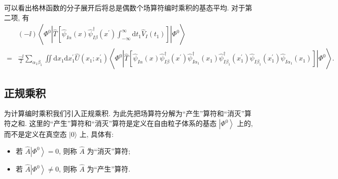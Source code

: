 可以看出格林函数的分子展开后将总是偶数个场算符编时乘积的基态平均. 对于第二项, 有
\begin{equation}
\begin{aligned}
&(-\ii)\left\langle\Phi^{0}\left|\hat{T}\left[\hat{\psi}^{}_{I \alpha}(x)\hat{\psi}^{\dagger}_{I \beta}\left(x^{\prime}\right) \int_{-\infty}^{\infty} \mathrm{d} t_1 \hat{V}_{I}(t_1)\right]\right| \Phi^{0}\right\rangle \\
=&\frac{-\ii}{2} \sum_{\alpha_1 \beta_1} \iint \mathrm{d}{x^{}_1} \mathrm{d} x_1^{\prime}  \hat U\left(x^{}_1 ; x_1^{\prime}\right)\left\langle\Phi^{0}\left|\hat{T}\left[\hat{\psi}^{}_{I \alpha}(x^{})\hat{\psi}^{\dagger}_{I \beta}\left(x^{\prime}\right)\hat{\psi}^{\dagger}_{I \alpha_1}(x^{}_1)\hat{\psi}^{\dagger}_{I \beta_1}\left(x^{\prime}_1\right)\hat{\psi}^{}_{I \beta_1}\left(x_1^{\prime}\right)\hat{\psi}^{}_{I \alpha_1}(x^{}_1) \right]\right| \Phi^{0}\right\rangle.
\end{aligned}
\end{equation}

\subsection{正规乘积}
为计算编时乘积我们引入正规乘积. 为此先把场算符分解为“产生”算符和“消灭”算符之和. 这里的“产生”算符和“消灭”算符是定义在自由粒子体系的基态 $\left|\Phi^{0}\right\rangle$ 上的, 而不是定义在真空态 $|0\rangle$ 上, 具体有:
\begin{itemize} 
\item 若 $\hat{A}\left|\Phi^{0}\right\rangle=0$, 则称 $\hat{A}$ 为“消灭”算符;
\item 若 $\hat{A}\left|\Phi^{0}\right\rangle \neq 0$, 则称 $\hat{A}$ 为“产生”算符.
\end{itemize}

